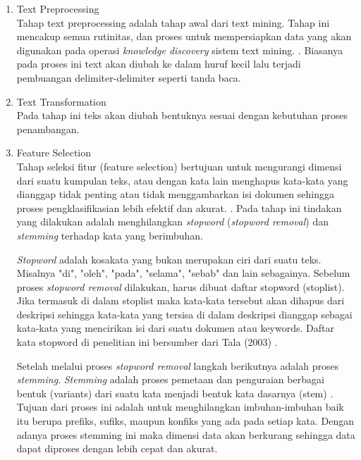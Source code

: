 \begin{enumerate}
	\item Text Preprocessing\\
	Tahap text preprocessing adalah tahap awal dari text mining. Tahap ini mencakup semua rutinitas, dan proses untuk mempersiapkan data yang akan digunakan pada operasi \textit{knowledge discovery} sistem text mining. \cite{feldman2007text}. Biasanya pada proses ini text akan diubah ke dalam huruf kecil lalu terjadi pembuangan delimiter-delimiter seperti tanda baca.
	
	\item Text Transformation\\
	Pada tahap ini teks akan diubah bentuknya sesuai dengan kebutuhan proses penambangan.
	
	\item Feature Selection\\
	Tahap seleksi fitur (feature selection) bertujuan untuk mengurangi dimensi dari suatu kumpulan teks, atau dengan kata lain menghapus kata-kata yang dianggap tidak penting atau tidak menggambarkan isi dokumen sehingga proses pengklasifikasian lebih efektif dan akurat. \cite{manalu2014analisis}. Pada tahap ini tindakan yang dilakukan adalah menghilangkan \textit{stopword} (\textit{stopword removal}) dan \textit{stemming} terhadap kata yang berimbuhan.\cite{berry2010text}
	
	\textit{Stopword} adalah kosakata yang bukan merupakan ciri dari suatu teks. Misalnya "di", "oleh", "pada", "selama", "sebab" dan lain sebagainya. Sebelum proses \textit{stopword removal} dilakukan, harus dibuat daftar stopword (stoplist). Jika termasuk di dalam stoplist maka kata-kata tersebut akan dihapus dari deskripsi sehingga kata-kata yang tersisa di dalam deskripsi dianggap sebagai kata-kata yang mencirikan isi dari suatu dokumen atau keywords. Daftar kata stopword di penelitian ini bersumber dari Tala (2003) \cite{tala2003study}.
	
	Setelah melalui proses \textit{stopword removal} langkah berikutnya adalah proses \textit{stemming}. \textit{Stemming} adalah proses pemetaan dan penguraian berbagai bentuk (variants) dari suatu kata menjadi bentuk kata dasarnya (stem) \cite{tala2003study}. Tujuan dari proses ini adalah untuk menghilangkan imbuhan-imbuhan baik itu berupa prefiks, sufiks, maupun konfiks yang ada pada setiap kata. \cite{manalu2014analisis} Dengan adanya proses stemming ini maka dimensi data akan berkurang sehingga data dapat diproses dengan lebih cepat dan akurat.
\end{enumerate}

